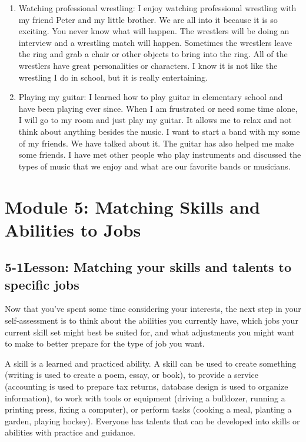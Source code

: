 \begin{enumerate}[leftmargin=*]
\item Watching professional wrestling: I enjoy watching professional wrestling with my friend Peter and my little brother. We are all into it because it is so exciting. You never know what will happen. The wrestlers will be doing an interview and a wrestling match will happen. Sometimes the wrestlers leave the ring and grab a chair or other objects to bring into the ring. All of the wrestlers have great personalities or characters. I know it is not like the wrestling I do in school, but it is really entertaining.
\item Playing my guitar: I learned how to play guitar in elementary school and have been playing ever since. When I am frustrated or need some time alone, I will go to my room and just play my guitar. It allows me to relax and not think about anything besides the music. I want to start a band with my some of my friends. We have talked about it. The guitar has also helped me make some friends. I have met other people who play instruments and discussed the types of music that we enjoy and what are our favorite bands or musicians.
 \end{enumerate}
 
\pagebreak \section*{Module 5:	Matching Skills and Abilities to Jobs}
\noindent\makebox[\textwidth]{\rule{\linewidth}{0.4pt}} 
\localtableofcontents 
\noindent\makebox[\textwidth]{\rule{\linewidth}{0.4pt}} 


\pagebreak \subsection*{5-1\quad Lesson: Matching your skills and talents to specific jobs}
Now that you've spent some time considering your interests, the next step in your self-assessment is to think about the abilities you currently have, which jobs your current skill set might best be suited for, and what adjustments you might want to make to better prepare for the type of job you want.

A skill is a learned and practiced ability. A skill can be used to create something (writing is used to create a poem, essay, or book), to provide a service (accounting is used to prepare tax returns, database design is used to organize information), to work with tools or equipment (driving a bulldozer, running a printing press, fixing a computer), or perform tasks (cooking a meal, planting a garden, playing hockey). Everyone has talents that can be developed into skills or abilities with practice and guidance.

